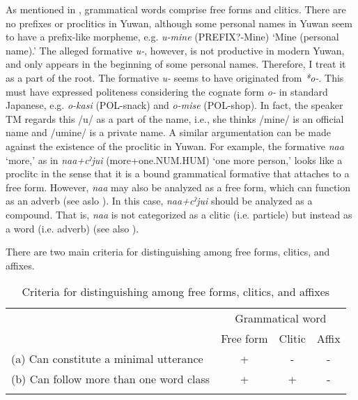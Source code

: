 As mentioned in , grammatical words comprise free forms and clitics. There are no prefixes or proclitics in Yuwan, although some personal names in Yuwan seem to have a prefix-like morpheme, e.g. \textit{u{}-mine} (PREFIX?-Mine) ‘Mine (personal name).’ The alleged formative \textit{u-}, however, is not productive in modern Yuwan, and only appears in the beginning of some personal names. Therefore, I treat it as a part of the root. The formative \textit{u-} seems to have originated from \textit{*o-}. This must have expressed politeness considering the cognate form \textit{o-} in standard Japanese, e.g. \textit{o-kasi} (POL-snack) and \textit{o-mise} (POL-shop). In fact, the speaker TM regards this /u/ as a part of the name, i.e., she thinks /mine/ is an official name and /umine/ is a private name. A similar argumentation can be made against the existence of the proclitic in Yuwan. For example, the formative \textit{naa} ‘more,’ as in \textit{naa+cˀjui} (more+one.NUM.HUM) ‘one more person,’ looks like a proclitc in the sense that it is a bound grammatical formative that attaches to a free form. However, \textit{naa} may also be analyzed as a free form, which can function as an adverb (see aslo ). In this case, \textit{naa+cˀjui} should be analyzed as a compound. That is, \textit{naa} is not categorized as a clitic (i.e. particle) but instead as a word (i.e. adverb) (see also ).

There are two main criteria for distinguishing among free forms, clitics, and affixes.

\begin{table}
\caption{\label{tab:24}Criteria for distinguishing among free forms, clitics, and affixes}
\begin{tabular}{lccc}
\lsptoprule
& \multicolumn{3}{c}{Grammatical word}\\
& Free form  & Clitic &  Affix\\\midrule
(a) Can constitute a minimal utterance  & +  & {}- &  {}-\\
(b) Can follow more than one word class & +  & +   & {}- \\
\lspbottomrule
\end{tabular}
\end{table}

